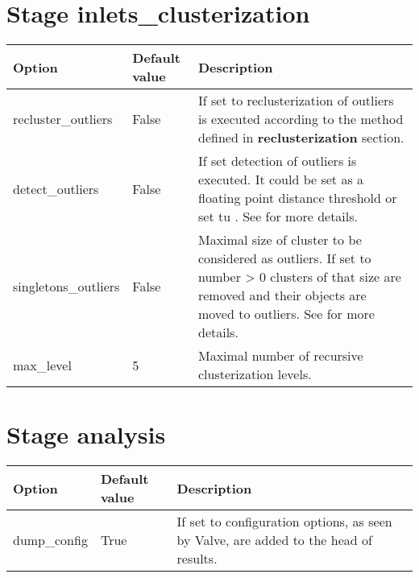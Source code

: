 \documentclass[a4paper,10pt,english]{sphinxmanual}
\begin{document}
\section{Stage \textbf{inlets\_clusterization}}
\label{valve/valve_config:stage-inlets-clusterization}
\begin{tabulary}{\linewidth}{|L|L|L|}
\hline
\textsf{\relax 
Option
} & \textsf{\relax 
Default value
} & \textsf{\relax 
Description
}\\
\hline
recluster\_outliers
 & 
False
 & 
If set to  reclusterization of outliers is executed
according to the method defined in \textbf{reclusterization} section.
\\
\hline
detect\_outliers
 & 
False
 & 
If set detection of outliers is executed. It could be set as a
floating point distance threshold or set tu . See
{\hyperref[valve/valve_manual:clusterization\string-of\string-inlets]{}} for more details.
\\
\hline
singletons\_outliers
 & 
False
 & 
Maximal size of cluster to be considered as outliers. If set to
number \textgreater{} 0 clusters of that size are removed and their objects
are moved to outliers. See {\hyperref[valve/valve_manual:clusterization\string-of\string-inlets]{}} for
more details.
\\
\hline
max\_level
 & 
5
 & 
Maximal number of recursive clusterization levels.
\\
\hline\end{tabulary}



\section{Stage \textbf{analysis}}
\label{valve/valve_config:stage-analysis}
\begin{tabulary}{\linewidth}{|L|L|L|}
\hline
\textsf{\relax 
Option
} & \textsf{\relax 
Default value
} & \textsf{\relax 
Description
}\\
\hline
dump\_config
 & 
True
 & 
If set to  configuration options, as seen by Valve, are
added to the head of results.
\\
\hline\end{tabulary}
\end{document}
